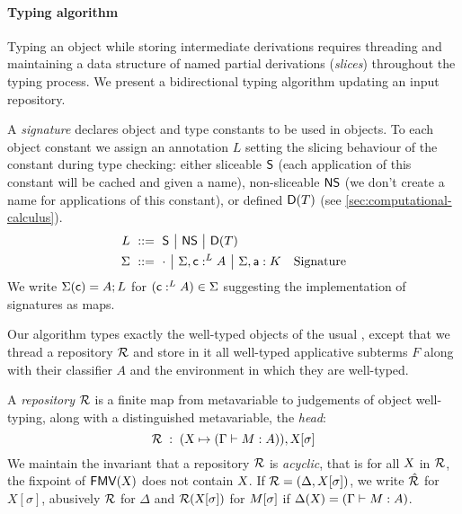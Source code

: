 \documentclass[9pt]{sigplanconf}
\begin{document}

\paragraph{Typing algorithm}

Typing an object while storing intermediate derivations requires
threading and maintaining a data structure of named partial
derivations (\emph{slices}) throughout the typing process. We present
a bidirectional typing algorithm updating an input repository.

A \emph{signature} declares object and type constants to be used in
objects. To each object constant we assign an annotation $L$ setting
the slicing behaviour of the constant during type checking: either
sliceable $\mathsf{S}$ (each application of this constant will be
cached and given a name), non-sliceable $\mathsf{NS}$ (we don't
create a name for applications of this constant), or defined
$\mathsf{D}({T})$ (see \ref{sec:computational-calculus}).
\begin{align*}
  L &\ ::=\ 
  \mathsf{S} \ {\big|}\ 
  \mathsf{NS} \ {\big|}\ 
  \mathsf{D}({T})
  \\
  \Sigma &\ ::=\ 
  \cdot \ {\big|}\ 
  {\Sigma},{\text{\textsf{c}} :^L A} \ {\big|}\ 
  {\Sigma},{\text{\textsf{a}} : K}
  &\text{Signature}
\end{align*}
We write $\Sigma(\text{\textsf{c}}) = A; L$ for $(\text{\textsf{c}} :^L A) \in \Sigma$
suggesting the implementation of signatures as maps.

Our algorithm types exactly the well-typed objects of the usual
\LF, except that we thread a repository $\mathcal{R}$ and store in it
all well-typed applicative subterms $F$ along with their classifier
$A$ and the environment in which they are well-typed.


A \emph{repository} $\mathcal{R}$ is a finite map from metavariable to
judgements of object well-typing, along with a distinguished
metavariable, the \emph{head}:
$$ \mathcal{R}\;:\;(\text{\textsl{X}} \mapsto (\Gamma\vdash{M}:{A})), {\text{\textsl{X}}}[{\sigma}] $$
We maintain the invariant that a repository $\mathcal{R}$ is
\emph{acyclic}, that is for all $\text{\textsl{X}}$ in $\mathcal{R}$, the fixpoint
of ${\text{\textsf{FMV}}}({\text{\textsl{X}}})$ does not contain $\text{\textsl{X}}$. If $\mathcal{R} =
(\Delta, X[\sigma])$, we write $\hat {\mathcal{R}}$ for $X[\sigma]$,
abusively $\mathcal{R}$ for $\Delta$ and $\mathcal{R} ({\text{\textsl{X}}}[{\sigma}])$ for
${M}[{\sigma}]$ if $\Delta(\text{\textsl{X}}) = (\Gamma\vdash M : A)$.
\end{document}
